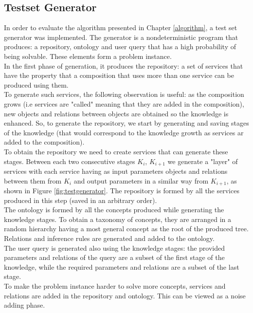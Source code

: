 \documentclass[12pt]{article}
\theoremstyle{definition}
\begin{document}
		\subsection{Testset Generator}
		In order to evaluate the algorithm presented in Chapter \ref{algorithm}, a test set generator was implemented. The generator is a nondeterministic program that produces: a repository, ontology and user query that has a high probability of being solvable. These elements form a problem instance. \\
		In the first phase of generation, it produces the repository: a set of services that have the property that a composition that uses more than one service can be produced using them.\\
		To generate such services, the following observation is useful: as the composition grows (i.e services are "called" meaning that they are added in the composition), new objects and relations between objects are obtained so the knowledge is enhanced. So, to generate the repository, we start by generating and saving stages of the knowledge (that would correspond to the knowledge growth as services ar added to the composition). \\
		To obtain the repository we need to create services that can generate these stages. Between each two consecutive stages $K_i$, $K_{i+1}$ we generate a "layer" of services with each service having as input parameters objects and relations between them from $K_i$ and output parameters in a similar way from $K_{i+1}$, as shown in Figure \ref{fig:testgenerator}. The repository is formed by all the services produced in this step (saved in an arbitrary order). \\
		The ontology is formed by all the concepts produced while generating the knowledge stages. To obtain a taxonomy of concepts, they are arranged in a random hierarchy having a most general concept as the root of the produced tree. Relations and inference rules are generated and added to the ontology. \\ 
		The user query is generated also using the knowledge stages: the provided parameters and relations of the query are a subset of the first stage of the knowledge, while the required parameters and relations are a subset of the last stage. \\
		To make the problem instance harder to solve more concepts, services and relations are added in the repository and ontology. This can be viewed as a noise adding phase.\\
		
\end{document}
